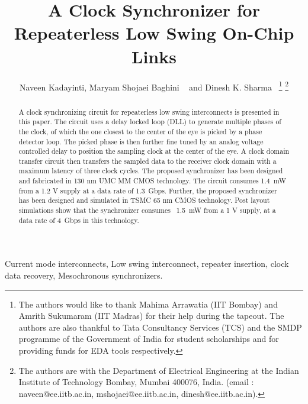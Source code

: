\documentclass[journal,twoside,letterpaper]{IEEEtran}
\begin{document}
\title{A Clock Synchronizer for Repeaterless Low Swing On-Chip Links}
\author{Naveen Kadayinti, 
Maryam Shojaei Baghini ~ and 
Dinesh K. Sharma ~\thanks{The authors would like to thank  Mahima Arrawatia (IIT Bombay) and 
Amrith Sukumaram (IIT Madras) for their help during the tapeout. 
The authors are also thankful to Tata Consultancy Services (TCS)
and the SMDP programme of the Government of India for student scholarships
and for providing funds for EDA tools respectively.}
\thanks{The authors are with the Department of Electrical 
Engineering at the Indian Institute of Technology Bombay, 
Mumbai 400076, India. (email : 
\mbox{naveen@ee.iitb.ac.in}, 
\mbox{mshojaei@ee.iitb.ac.in}, 
\mbox{dinesh@ee.iitb.ac.in}).}
}



\maketitle
\begin{abstract}
A clock synchronizing circuit for repeaterless low swing interconnects 
is presented in this paper. The circuit uses a delay locked loop (DLL) 
to generate multiple phases of the clock, of which the one closest to 
the center of the eye is picked by a phase detector loop. The picked 
phase is then further fine tuned by an analog voltage controlled delay 
to position the sampling clock at the center of the eye. A clock domain 
transfer circuit then transfers the sampled data to the receiver clock 
domain with a maximum latency of three clock cycles. 
The proposed synchronizer has been designed and fabricated in 130 nm 
UMC MM CMOS technology. The circuit consumes \mbox{1.4 mW} 
from a 1.2 V supply at a  data rate of 
\mbox{1.3 Gbps}. Further, the proposed synchronizer 
has been designed and simulated in TSMC 65 nm CMOS technology. 
Post layout simulations show that the synchronizer consumes \mbox{
1.5 mW} from a 1 V supply, at a data rate of \mbox{4 Gbps} in this 
technology.
\end{abstract}


\begin{IEEEkeywords}
Current mode interconnects, Low swing interconnect, repeater insertion, 
clock data recovery, Mesochronous synchronizers.
\end{IEEEkeywords}
\end{document}
